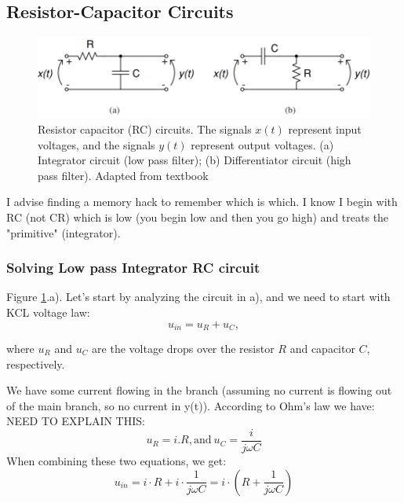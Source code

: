 \subsection{Resistor-Capacitor Circuits}

\begin{figure}[H]
    \centering
    \includegraphics[width=0.8\linewidth]{../../Figures/RC_Circuits.PNG}
    \caption{Resistor capacitor (RC) circuits. The signals $x(t)$ represent input voltages, and the signals $y(t)$ represent output voltages. (a) Integrator circuit (low pass filter); (b) Differentiator circuit (high pass filter). Adapted from textbook}
    \label{fig:RC_Circuits}
\end{figure}

I advise finding a memory hack to remember which is which. I know I begin with RC (not CR) which is low (you begin low and then you go high) and treats the "primitive" (integrator).   

\subsubsection{Solving Low pass Integrator RC circuit}

Figure \ref{fig:RC_Circuits}.a). Let's start by analyzing the circuit in a), and we need to start with KCL voltage law: 
\begin{equation}
    u_{in} = u_R + u_C, 
\end{equation}

where $u_R$ and $u_C$ are the voltage drops over the resistor $R$ and capacitor $C$, respectively. 

We have some current flowing in the branch (assuming no current is flowing out of the main branch, so no current in y(t)). According to Ohm's law we have: NEED TO EXPLAIN THIS: 
\begin{equation}
    u_R = i.R \mathrm{, and }\ u_C = \frac{i}{j\omega C} 
\end{equation}
When combining these two equations, we get: 
\begin{equation}
    u_{in} = i\cdot R + i\cdot \frac{1}{j \omega C} = i \cdot (R + \frac{1}{j \omega C})
\end{equation}

